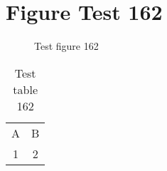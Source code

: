 \documentclass{article}
\begin{document}
\section{Figure Test 162}
\begin{figure}[h]
\caption{Test figure 162}
\end{figure}
\begin{table}[h]
\caption{Test table 162}
\begin{tabular}{cc}
A & B \\
1 & 2
\end{tabular}
\end{table}
\end{document}

